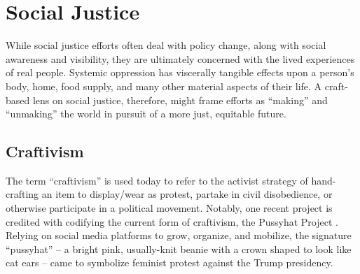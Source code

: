 
\section{Social Justice}

While social justice efforts often deal with policy change, along with social awareness and visibility, they are ultimately concerned with the lived experiences of real people. Systemic oppression has viscerally tangible effects upon a person's body, home, food supply, and many other material aspects of their life. A craft-based lens on social justice, therefore, might frame efforts as ``making'' and ``unmaking'' the world in pursuit of a more just, equitable future.

\subsection{Craftivism}

The term ``craftivism'' is used today to refer to the activist strategy of hand-crafting an item to display/wear as protest, partake in civil disobedience, or otherwise participate in a political movement. Notably, one recent project is credited with codifying the current form of craftivism, the Pussyhat Project \cite{pussyhat_site,literat_crafting_2020}. Relying on social media platforms to grow, organize, and mobilize, the signature ``pussyhat'' -- a bright pink, usually-knit beanie with a crown shaped to look like cat ears -- came to symbolize feminist protest against the Trump presidency.

